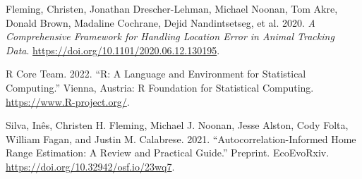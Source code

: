 \documentclass[
]{article}
\newlength{\cslhangindent}
\newenvironment{CSLReferences}[2] %
 {\begin{list}{}{%
  \setlength{\itemindent}{0pt}
  \setlength{\leftmargin}{0pt}
  \setlength{\parsep}{0pt}
  \ifodd #1
   \setlength{\leftmargin}{\cslhangindent}
   \setlength{\itemindent}{-1\cslhangindent}
  \fi
  \setlength{\itemsep}{#2\baselineskip}}}
 {\end{list}}
\begin{document}
\begin{CSLReferences}{1}{0}
Fleming, Christen, Jonathan Drescher-Lehman, Michael Noonan, Tom Akre,
Donald Brown, Madaline Cochrane, Dejid Nandintsetseg, et al. 2020.
\emph{A Comprehensive Framework for Handling Location Error in Animal
Tracking Data}. \url{https://doi.org/10.1101/2020.06.12.130195}.

R Core Team. 2022. {``R: A Language and Environment for Statistical
Computing.''} Vienna, Austria: R Foundation for Statistical Computing.
\url{https://www.R-project.org/}.

Silva, Inês, Christen H. Fleming, Michael J. Noonan, Jesse Alston, Cody
Folta, William Fagan, and Justin M. Calabrese. 2021.
{``Autocorrelation-Informed Home Range Estimation: A Review and
Practical Guide.''} Preprint. EcoEvoRxiv.
\url{https://doi.org/10.32942/osf.io/23wq7}.

\end{CSLReferences}
\end{document}
